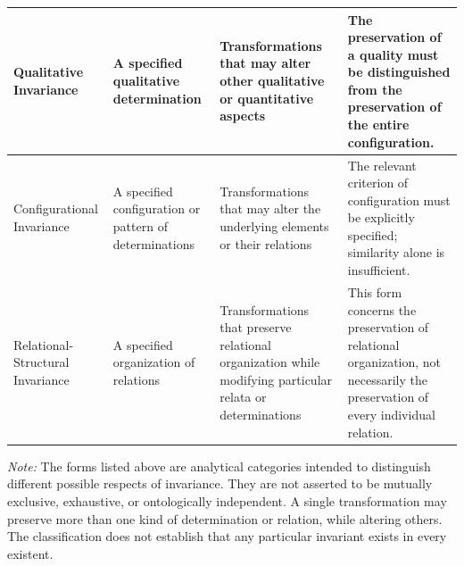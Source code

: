 \begin{table}[htbp]
\begin{tabular}{
        p{2.7cm}
        p{3.1cm}
        p{3.4cm}
        p{4.0cm}
    }
        Qualitative Invariance
        &
        A specified qualitative determination
        &
        Transformations that may alter other qualitative or quantitative
        aspects
        &
        The preservation of a quality must be distinguished from the
        preservation of the entire configuration.
        \\
        \hline

        Configurational Invariance
        &
        A specified configuration or pattern of determinations
        &
        Transformations that may alter the underlying elements or
        their relations
        &
        The relevant criterion of configuration must be explicitly
        specified; similarity alone is insufficient.
        \\
        \hline

        Relational-Structural Invariance
        &
        A specified organization of relations
        &
        Transformations that preserve relational organization while
        modifying particular relata or determinations
        &
        This form concerns the preservation of relational organization,
        not necessarily the preservation of every individual relation.
        \\
        \hline

    \end{tabular}

    \vspace{0.5em}

    \begin{minipage}{0.95\textwidth}
        \footnotesize
        \textit{Note:}
        The forms listed above are analytical categories intended
        to distinguish different possible respects of invariance.
        They are not asserted to be mutually exclusive, exhaustive,
        or ontologically independent.
        A single transformation may preserve more than one kind
        of determination or relation, while altering others.
        The classification does not establish that any particular
        invariant exists in every existent.
    \end{minipage}

\end{table}
